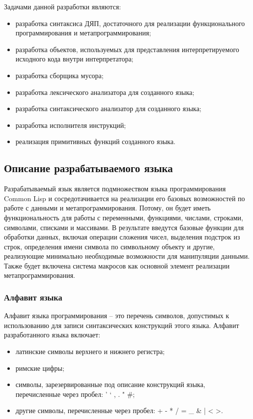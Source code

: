 Задачами данной разработки являются:
\begin{itemize}
\item разработка синтаксиса ДЯП, достаточного для реализации функционального программирования и метапрограммирования;
\item разработка объектов, используемых для представления интерпретируемого исходного кода внутри интерпретатора;
\item разработка сборщика мусора;
\item разработка лексического анализатора для созданного языка;
\item разработка синтаксического анализатор для созданного языка;
\item разработка исполнителя инструкций;
\item реализация примитивных функций созданного языка.

\end{itemize}


\subsection{Описание разрабатываемого языка}

Разрабатываемый язык является подмножеством языка программирования Common Lisp и сосредотачивается на реализации его базовых возможностей по работе с данными и метапрограммирования. Потому, он будет иметь функциональность для работы с переменными, функциями, числами, строками, символами, списками и массивами. В результате введутся базовые функции для обработки данных, включая операции сложения чисел, выделения подстрок из строк, определения имени символа по символьному объекту и другие, реализующие минимально необходимые возможности для манипуляции данными. Также будет включена система макросов как основной элемент реализации метапрограммирования.

\subsubsection{Алфавит языка}
Алфавит языка программирования -- это перечень символов, допустимых к использованию для записи синтаксических конструкций этого языка. 
Алфавит разработанного языка включает:
\begin{itemize}
	\item латинские символы верхнего и нижнего регистра;
	\item римские цифры;
	\item символы, зарезервированные под описание конструкций языка, перечисленные через пробел: ' ` , . " \#;
	\item другие символы, перечисленные через пробел: + - * / = \_ \& | < >.
\end{itemize}

